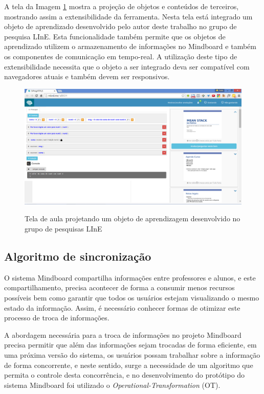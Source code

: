 A tela da Imagem \ref{fig:tela_ivprog} mostra a projeção de objetos e conteúdos de terceiros, mostrando assim a extensibilidade da ferramenta. Nesta tela está integrado um objeto de aprendizado desenvolvido pelo autor deste trabalho no grupo de pesquisa LInE. Esta funcionalidade também permite que os objetos de aprendizado utilizem o armazenamento de informações no Mindboard e também os componentes de comunicação em tempo-real. A utilização deste tipo de extensibilidade necessita que o objeto a ser integrado deva ser compatível com navegadores atuais e também devem ser responsivos.

\begin{figure}
\centering
\caption{Tela de aula projetando um objeto de aprendizagem desenvolvido no grupo de pesquisas LInE}
\includegraphics[width=1.0\textwidth]{imgs/tela_ivprog.png} 
\label{fig:tela_ivprog} 
\end{figure}


\subsection{Algoritmo de sincronização}
\label{sec:alg_ot}

O sistema Mindboard compartilha informações entre professores e alunos, e este compartilhamento, precisa acontecer de forma a consumir menos recursos possíveis bem como garantir que todos os usuários estejam visualizando o mesmo estado da informação. Assim, é necessário conhecer formas de otimizar este processo de troca de informações.

A abordagem necessária para a troca de informações no projeto Mindboard precisa permitir que além das informações sejam trocadas de forma eficiente, em uma próxima versão do sistema, os usuários possam trabalhar sobre a informação de forma concorrente, e neste sentido, surge a necessidade de um algoritmo que permita o controle desta concorrência, e no desenvolvimento do protótipo do sistema Mindboard foi utilizado o \emph{Operational-Transformation} (OT).

